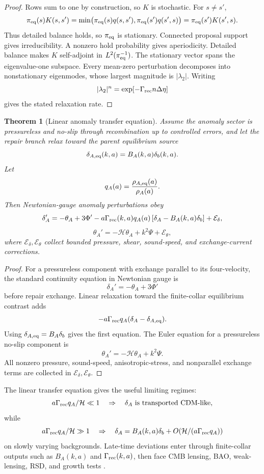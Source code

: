 \documentclass[11pt]{article}
\newtheorem{theorem}{Theorem}[section]
\begin{document}
\begin{proof}
Rows sum to one by construction, so \(K\) is stochastic. For \(s\ne s'\),
\[
\pi_{\rm eq}(s)K(s,s')
=
\min\bigl(
\pi_{\rm eq}(s)q(s,s'),
\pi_{\rm eq}(s')q(s',s)
\bigr)
=
\pi_{\rm eq}(s')K(s',s).
\]
Thus detailed balance holds, so \(\pi_{\rm eq}\) is stationary. Connected proposal support gives
irreducibility. A nonzero hold probability gives aperiodicity. Detailed balance makes \(K\)
self-adjoint in \(L^2(\pi_{\rm eq}^{-1})\). The stationary vector spans the eigenvalue-one
subspace. Every mean-zero perturbation decomposes into nonstationary eigenmodes, whose largest
magnitude is \(|\lambda_2|\). Writing
\[
|\lambda_2|^n
=
\exp[-\Gamma_{\rm rec}n\Delta\eta]
\]
gives the stated relaxation rate.
\end{proof}

\begin{theorem}[Linear anomaly transfer equation]\label{thm:linear-anomaly-transfer}
Assume the anomaly sector is pressureless and no-slip through recombination up to controlled
errors, and let the repair branch relax toward the parent equilibrium source
\[
\delta_{A,\rm eq}(k,a)=B_A(k,a)\delta_b(k,a).
\]
Let
\[
q_A(a)=\frac{\rho_{A,\rm eq}(a)}{\rho_A(a)}.
\]
Then Newtonian-gauge anomaly perturbations obey
\[
\delta_A'
=
-\theta_A+3\Phi'
-
a\Gamma_{\rm rec}(k,a)q_A(a)
\left[
\delta_A-B_A(k,a)\delta_b
\right]
+
\mathcal E_\delta,
\]
\[
\theta_A'
=
-\mathcal H\theta_A+k^2\Psi+\mathcal E_\theta,
\]
where \(\mathcal E_\delta,\mathcal E_\theta\) collect bounded pressure, shear, sound-speed, and
exchange-current corrections.
\end{theorem}

\begin{proof}
For a pressureless component with exchange parallel to its four-velocity, the standard continuity
equation in Newtonian gauge is
\[
\delta_A'=-\theta_A+3\Phi'
\]
before repair exchange. Linear relaxation toward the finite-collar equilibrium contrast adds
\[
-a\Gamma_{\rm rec}q_A(\delta_A-\delta_{A,\rm eq}).
\]
Using \(\delta_{A,\rm eq}=B_A\delta_b\) gives the first equation. The Euler equation for a
pressureless no-slip component is
\[
\theta_A'=-\mathcal H\theta_A+k^2\Psi.
\]
All nonzero pressure, sound-speed, anisotropic-stress, and nonparallel exchange terms are collected
in \(\mathcal E_\delta,\mathcal E_\theta\).
\end{proof}

The linear transfer equation gives the useful limiting regimes:
\[
a\Gamma_{\rm rec}q_A/\mathcal H\ll1
\quad\Rightarrow\quad
\delta_A\ \text{is transported CDM-like},
\]
while
\[
a\Gamma_{\rm rec}q_A/\mathcal H\gg1
\quad\Rightarrow\quad
\delta_A
=
B_A(k,a)\delta_b
+
O(\mathcal H/(a\Gamma_{\rm rec}q_A))
\]
on slowly varying backgrounds.
Late-time deviations enter through finite-collar outputs such as \(B_A(k,a)\) and
\(\Gamma_{\rm rec}(k,a)\), then face CMB lensing, BAO, weak-lensing, RSD, and growth tests
\cite{ophdark,desi2025}.
\end{document}
